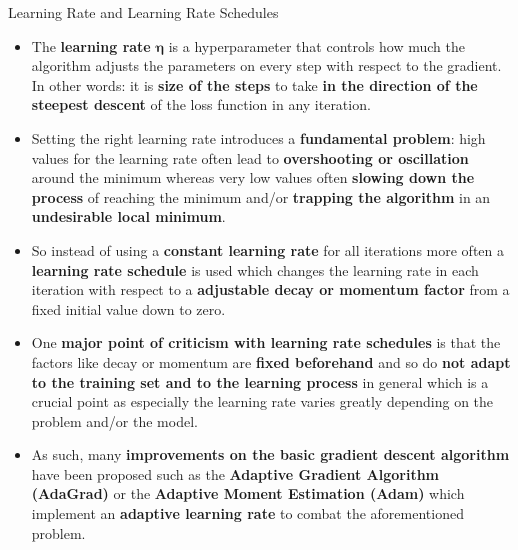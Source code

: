 \documentclass[main.tex]{subfiles}
\begin{document}
    \begin{frame}{Learning Rate and Learning Rate Schedules}
        \begin{itemize}
            \item The \textbf{learning rate} $\pmb{\eta}$ is a hyperparameter that controls how much the algorithm adjusts the parameters on every step with respect to the gradient. In other words: it is \textbf{size of the steps} to take \textbf{in the direction of the steepest descent} of the loss function in any iteration.
            \item Setting the right learning rate introduces a \textbf{fundamental problem}: high values for the learning rate often lead to \textbf{overshooting or oscillation} around the minimum whereas very low values often \textbf{slowing down the process} of reaching the minimum and/or \textbf{trapping the algorithm} in an \textbf{undesirable local minimum}.
            \item So instead of using a \textbf{constant learning rate} for all iterations more often a \textbf{learning rate schedule} is used which changes the learning rate in each iteration with respect to a \textbf{adjustable decay or momentum factor} from a fixed initial value down to zero.
            \item One \textbf{major point of criticism with learning rate schedules} is that the factors like decay or momentum are \textbf{fixed beforehand} and so do \textbf{not adapt to the training set and to the learning process} in general which is a crucial point as especially the learning rate varies greatly depending on the problem and/or the model.
            \item As such, many \textbf{improvements on the basic gradient descent algorithm} have been proposed such as the \textbf{Adaptive Gradient Algorithm (AdaGrad)} or the \textbf{Adaptive Moment Estimation (Adam)} which implement an \textbf{adaptive learning rate} to combat the aforementioned problem.
        \end{itemize}
    \end{frame}
\end{document}
